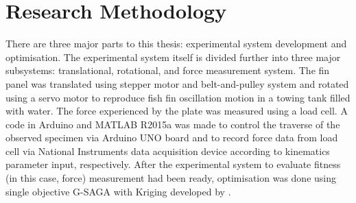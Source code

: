 \section{Research Methodology}
\label{sec:4}
There are three major parts to this thesis: experimental system development and optimisation. The experimental system itself is divided further into three major subsystems: translational, rotational, and force measurement system. The fin panel was translated using stepper motor and belt-and-pulley system and rotated using a servo motor to reproduce fish fin oscillation motion in a towing tank filled with water. The force experienced by the plate was measured using a load cell. A code in Arduino and MATLAB R2015a was made to control the traverse of the observed specimen via Arduino UNO board and to record force data from load cell via National Instruments data acquisition device according to kinematics parameter input, respectively. After the experimental system to evaluate fitness (in this case, force) measurement had been ready, optimisation was done using single objective G-SAGA with Kriging developed by \citet{kadal}.
